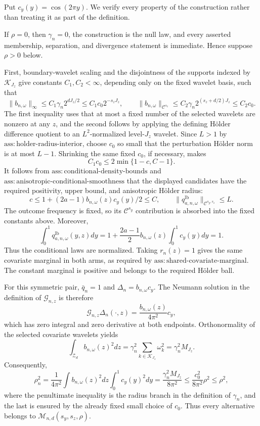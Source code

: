 Put \(c_y(y)=\cos(2\pi y)\).  We verify every property of the construction rather than treating it as part of the definition.

If \(\rho=0\), then \(\gamma_n=0\), the construction is the null law, and every asserted membership, separation, and divergence statement is immediate.  Hence suppose \(\rho>0\) below.

First, boundary-wavelet scaling and the disjointness of the supports indexed by \(\mathcal K_{J_z}\) give constants \(C_1,C_2<\infty\), depending only on the fixed wavelet basis, such that
\[
 \|b_{n,\omega}\|_\infty
 \le C_1\gamma_n2^{dJ_z/2}
 \le C_1c_0 2^{-s_zJ_z},
 \qquad
 \|b_{n,\omega}\|_{\mathcal C^{s_z}}
 \le C_2\gamma_n2^{(s_z+d/2)J_z}
 \le C_2c_0.
\]
The first inequality uses that at most a fixed number of the selected wavelets are nonzero at any \(z\), and the second follows by applying the defining H\"older difference quotient to an \(L^2\)-normalized level-\(J_z\) wavelet.  Since \(L>1\) by \(\mathrm{ass{:}holder\text{-}radius\text{-}interior}\), choose \(c_0\) so small that the perturbation H\"older norm is at most \(L-1\).  Shrinking the same fixed \(c_0\), if necessary, makes
\[
 C_1c_0\le 2\min\{1-c,C-1\}.
\]
It follows from \(\mathrm{ass{:}conditional\text{-}density\text{-}bounds}\) and \(\mathrm{ass{:}anisotropic\text{-}conditional\text{-}smoothness}\) that the displayed candidates have the required positivity, upper bound, and anisotropic H\"older radius:
\[
 c\le 1+(2a-1)b_{n,\omega}(z)c_y(y)/2\le C,
 \qquad
 \|q_{a,n,\omega}^{\mathrm{lb}}\|_{\mathcal C^{s_y,s_z}}\le L.
\]
The outcome frequency is fixed, so its \(\mathcal C^{s_y}\) contribution is absorbed into the fixed constants above.  Moreover,
\[
 \int_0^1q_{a,n,\omega}^{\mathrm{lb}}(y,z)dy
 =1+\frac{2a-1}{2}b_{n,\omega}(z)\int_0^1c_y(y)dy=1.
\]
Thus the conditional laws are normalized.  Taking \(r_n(z)=1\) gives the same covariate marginal in both arms, as required by \(\mathrm{ass{:}shared\text{-}covariate\text{-}marginal}\).  The constant marginal is positive and belongs to the required H\"older ball.

For this symmetric pair, \(\bar q_n=1\) and \(\Delta_n=b_{n,\omega}c_y\).  The Neumann solution in the definition of \(\mathcal G_{n,z}\) is therefore
\[
 \mathcal G_{n,z}\Delta_n(\cdot,z)
 =\frac{b_{n,\omega}(z)}{4\pi^2}c_y,
\]
which has zero integral and zero derivative at both endpoints.  Orthonormality of the selected covariate wavelets yields
\[
 \int_{\mathcal Z_d}b_{n,\omega}(z)^2dz
 =\gamma_n^2\sum_{k\in\mathcal K_{J_z}}\omega_k^2
 =\gamma_n^2M_{J_z}.
\]
Consequently,
\[
 \rho_n^2
 =\frac{1}{4\pi^2}\int b_{n,\omega}(z)^2dz
       \int_0^1c_y(y)^2dy
 =\frac{\gamma_n^2M_{J_z}}{8\pi^2}
 \le \frac{c_0^2}{8\pi^2}\rho^2
 \le \rho^2,
\]
where the penultimate inequality is the radius branch in the definition of \(\gamma_n\), and the last is ensured by the already fixed small choice of \(c_0\).  Thus every alternative belongs to \(\mathcal M_{n,d}(s_y,s_z,\rho)\).

